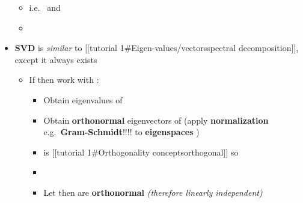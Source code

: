 \begin{itemize}
            \begin{itemize}

                  \item
                        i.e.~ and
                  \item
            \end{itemize}
      \item
            \textbf{SVD} is \emph{similar} to {[}{[}tutorial
            1\#Eigen-values/vectors\textbar spectral decomposition{]}{]}, except
            it always exists

            \begin{itemize}

                  \item
                        If  then work with
                        :

                        \begin{itemize}

                              \item
                                    Obtain eigenvalues
                                     of
                              \item
                                    Obtain \textbf{orthonormal} eigenvectors
                                     of
                                     (apply \textbf{normalization}
                                    e.g.~\textbf{Gram-Schmidt}!!!! to \textbf{eigenspaces}
                                    )
                              \item
                                    is {[}{[}tutorial 1\#Orthogonality
                                    concepts\textbar orthogonal{]}{]} so 
                              \item
                              \item
                                    Let
                                    then
                                     are
                                    \textbf{orthonormal} \emph{(therefore linearly independent)}


\end{itemize}
\end{itemize}
\end{itemize}
